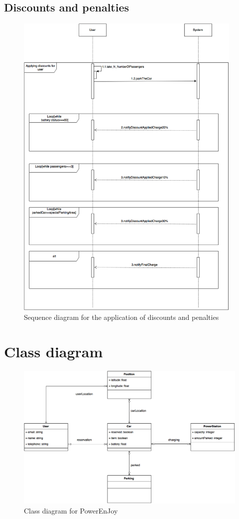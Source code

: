 \subsection{Discounts and penalties}
\begin{figure}[h]
\centering
\includegraphics[height=15.2cm,keepaspectratio]{figures/sequence_discounts_penalties.eps}
\caption{Sequence diagram for the application of discounts and penalties}
\label{fig:sequence_discounts_penalties}
\end{figure}

\newpage
\section{Class diagram}
\begin{figure}[h]
	\centering
	\includegraphics[width=\textwidth,keepaspectratio]{figures/class_diagram.eps}
	\caption{Class diagram for PowerEnJoy}
	\label{fig:class_diagram}
\end{figure}